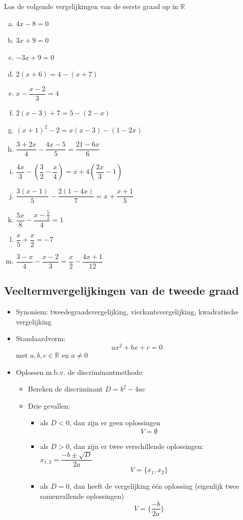 \documentclass[12pt]{article}
\begin{document}
\begin{oefening}
  Los de volgende vergelijkingen van de eerste graad op in $\mathbb{R}$
  \begin{multicols}{2}
    \begin{enumerate}[(a)]
      \itemsep0.7em
    \item $4x-8=0$
    \item $3x+9=0$
    \item $-3x+9=0$
    \item $2(x+6)=4-(x+7)$
    \item $x - \dfrac{x-2}{3} = 4$
    \item $2(x-3)+7=5-(2-x)$
    \item $(x+1)^2-2=x(x-3)-(1-2x)$
    \item $\dfrac{3+2x}{4}-\dfrac{4x-5}{5}=\dfrac{21-6x}{6}$
    \item $\dfrac{4x}{3}-\left(\dfrac{3}{2}-\dfrac{x}{4}\right)=x+4\left(\dfrac{2x}{3}-1\right)$
    \item $\dfrac{3(x-1)}{5}-\dfrac{2(1-4x)}{7}=x+\dfrac{x+1}{5}$
    \item $\dfrac{5x}{8}-\dfrac{x-\frac{5}{2}}{4}=1$
    \item $\dfrac{x}{5}+\dfrac{x}{2}=-7$
    \item $\dfrac{3-x}{4}-\dfrac{x-2}{3}=\dfrac{x}{2}-\dfrac{4x+1}{12}$
    \end{enumerate}
  \end{multicols}
\end{oefening}

\pagebreak
\subsection{Veeltermvergelijkingen van de tweede graad}

\begin{itemize}
\item Synoniem: tweedegraadsvergelijking, vierkantsvergelijking, kwadratische vergelijking
\item Standaardvorm:
  $$ax^2 + bx + c = 0$$
  met $a, b, c \in \mathbb{R}$ en $a\neq 0$
\item Oplossen m.b.v. de discriminantmethode:
  \begin{itemize}
  \item Bereken de discriminant $D=b^2-4ac$
  \item Drie gevallen:
    \begin{itemize}
    \item als $D<0$, dan zijn er geen oplossingen
      $$V=\emptyset$$
    \item als $D>0$, dan zijn er twee verschillende oplossingen: $x_{1,2}=\dfrac{-b\pm\sqrt{D}}{2a}$
      $$V=\{x_1, x_2\}$$
    \item als $D=0$, dan heeft de vergelijking één oplossing (eigenlijk twee samenvallende oplossingen)
      $$V=\{\dfrac{-b}{2a}\}$$
    \end{itemize}
  \end{itemize}
\end{itemize}
\end{document}

